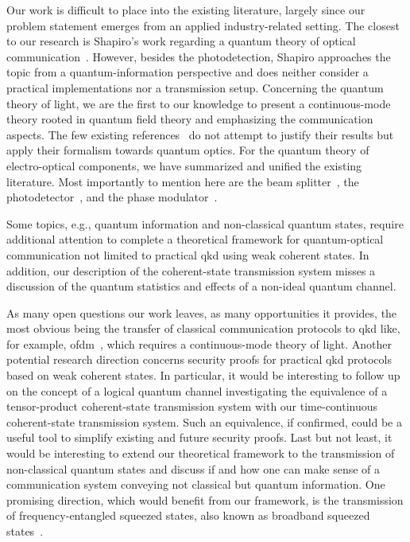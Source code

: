 Our work is difficult to place into the existing literature, largely since our problem statement emerges from an applied industry-related setting.
The closest to our research is Shapiro's work regarding a quantum theory of optical communication~\cite{Shapiro2009}.
However, besides the photodetection, Shapiro approaches the topic from a quantum-information perspective and does neither consider a practical implementations nor a transmission setup.
Concerning the quantum theory of light, we are the first to our knowledge to present a continuous-mode theory rooted in quantum field theory and emphasizing the communication aspects.
The few existing references~\cite{Barnett2002,Loudon2000} do not attempt to justify their results but apply their formalism towards quantum optics.
For the quantum theory of electro-optical components, we have summarized and unified the existing literature.
Most importantly to mention here are the beam splitter~\cite{Haroche2006,Leonhardt2003,Vogel2006}, the photodetector~\cite{Vogel2006,Mandel1995,Shapiro2009}, and the phase modulator~\cite{Horoshko2018,QuesadaMejia2015}.

Some topics, e.g., quantum information and non-classical quantum states, require additional attention to complete a theoretical framework for quantum-optical communication not limited to practical \gls{qkd} using weak coherent states.
In addition, our description of the coherent-state transmission system misses a discussion of the quantum statistics and effects of a non-ideal quantum channel.

As many open questions our work leaves, as many opportunities it provides, the most obvious being the transfer of classical communication protocols to \gls{qkd} like, for example, \gls{ofdm}~\cite{Bahrani2015}, which requires a continuous-mode theory of light.
Another potential research direction concerns security proofs for practical \gls{qkd} protocols based on weak coherent states.
In particular, it would be interesting to follow up on the concept of a logical quantum channel investigating the equivalence of a tensor-product coherent-state transmission system with our time-continuous coherent-state transmission system.
Such an equivalence, if confirmed, could be a useful tool to simplify existing and future security proofs.
Last but not least, it would be interesting to extend our theoretical framework to the transmission of non-classical quantum states and discuss if and how one can make sense of a communication system conveying not classical but quantum information.
One promising direction, which would benefit from our framework, is the transmission of frequency-entangled squeezed states, also known as broadband squeezed states~\cite{Vogel2006,Mandel1995}.